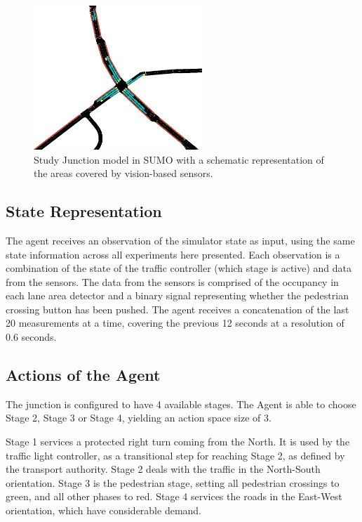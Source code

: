 \documentclass[conference]{IEEEtran}
\begin{document}
\begin{figure}                                                
\centering                                                    
\includegraphics[width=2.5in]{intersection}                                    
\caption{Study Junction model in SUMO with a schematic representation of the areas covered by vision-based sensors.}                                  
\label{intersection}                                               
\end{figure}     

\subsection{State Representation}
The agent receives an observation of the simulator state as input, using the same state information across all experiments here presented.
Each observation is a combination of the state of the traffic controller (which stage is active) and data from the sensors.
The data from the sensors is comprised of the occupancy in each lane area detector and a binary signal representing whether the pedestrian crossing button has been pushed.
The agent receives a concatenation of the last 20 measurements at a time, covering the previous 12 seconds at a resolution of 0.6 seconds.

\subsection{Actions of the Agent}
The junction is configured to have 4 available stages. 
The Agent is able to choose Stage 2, Stage 3 or Stage 4, yielding an action space size of 3.

Stage 1 services a protected right turn coming from the North. It is used by the traffic light controller, as a transitional step for reaching Stage 2, as defined by the transport authority.
Stage 2 deals with the traffic in the North-South orientation.
Stage 3 is the pedestrian stage, setting all pedestrian crossings to green, and all other phases to red.
Stage 4 services the roads in the East-West orientation, which have considerable demand.
\end{document}
